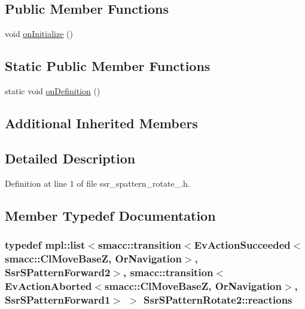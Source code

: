 \subsection*{Public Member Functions}
\begin{DoxyCompactItemize}
\item 
void \hyperlink{structSsrSPatternRotate2_acae719a6c582b769e997fd4a8f79d12a}{on\+Initialize} ()
\end{DoxyCompactItemize}
\subsection*{Static Public Member Functions}
\begin{DoxyCompactItemize}
\item 
static void \hyperlink{structSsrSPatternRotate2_acfc99af790632321111d347cd4315338}{on\+Definition} ()
\end{DoxyCompactItemize}
\subsection*{Additional Inherited Members}


\subsection{Detailed Description}


Definition at line 1 of file ssr\+\_\+spattern\+\_\+rotate\+\_.\+h.



\subsection{Member Typedef Documentation}
\subsubsection[{\texorpdfstring{reactions}{reactions}}]{\setlength{\rightskip}{0pt plus 5cm}typedef mpl\+::list$<${\bf smacc\+::transition}$<$Ev\+Action\+Succeeded$<${\bf smacc\+::\+Cl\+Move\+BaseZ}, {\bf Or\+Navigation}$>$, {\bf Ssr\+S\+Pattern\+Forward2}$>$, {\bf smacc\+::transition}$<$Ev\+Action\+Aborted$<${\bf smacc\+::\+Cl\+Move\+BaseZ}, {\bf Or\+Navigation}$>$, {\bf Ssr\+S\+Pattern\+Forward1}$>$ $>$ {\bf Ssr\+S\+Pattern\+Rotate2\+::reactions}}\hypertarget{structSsrSPatternRotate2_aec40f8fec6467ee60f0aecd09936d68f}{}\label{structSsrSPatternRotate2_aec40f8fec6467ee60f0aecd09936d68f}


